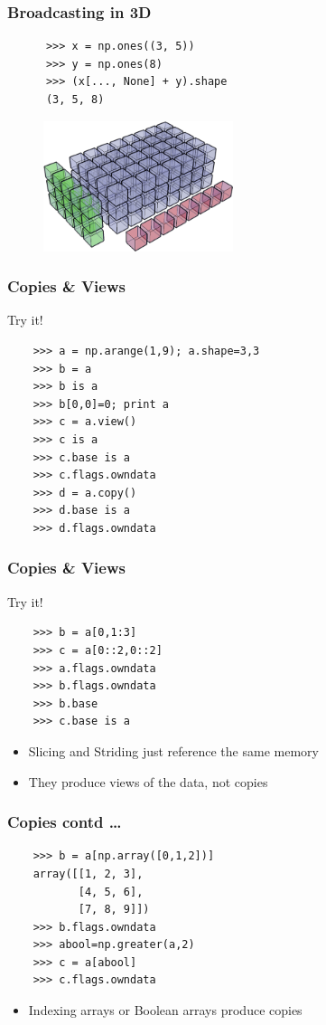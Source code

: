 \documentclass[14pt,compress]{beamer}
\newcounter{time}
\newcommand{\inctime}[1]{\addtocounter{time}{#1}{\tiny \thetime\ m}}
\begin{document}
\begin{frame}[fragile]
  \frametitle{Broadcasting in 3D}
    \begin{lstlisting}
      >>> x = np.ones((3, 5))
      >>> y = np.ones(8)
      >>> (x[..., None] + y).shape
      (3, 5, 8)
    \end{lstlisting}
    \begin{figure}
      \begin{center}
      \includegraphics[height=1.5in, interpolate=true]{data/array_3x5x8}        
      \end{center}
    \end{figure}
\end{frame}

\begin{frame}[fragile]
  \frametitle{Copies \& Views}
  Try it!
  \vspace{-0.1in}
  \begin{lstlisting}
    >>> a = np.arange(1,9); a.shape=3,3
    >>> b = a
    >>> b is a
    >>> b[0,0]=0; print a
    >>> c = a.view()
    >>> c is a
    >>> c.base is a
    >>> c.flags.owndata
    >>> d = a.copy()
    >>> d.base is a
    >>> d.flags.owndata
  \end{lstlisting}
\end{frame}

\begin{frame}[fragile]
  \frametitle{Copies \& Views}
  Try it!
  \vspace{-0.1in}
  \begin{lstlisting}
    >>> b = a[0,1:3]
    >>> c = a[0::2,0::2]
    >>> a.flags.owndata
    >>> b.flags.owndata
    >>> b.base
    >>> c.base is a
  \end{lstlisting}
  \begin{itemize}
  \item Slicing and Striding just reference the same memory
  \item They produce views of the data, not copies
  \end{itemize}
\end{frame}

\begin{frame}[fragile]
  \frametitle{Copies contd \ldots}
  \begin{lstlisting}
    >>> b = a[np.array([0,1,2])]
    array([[1, 2, 3],
           [4, 5, 6],
           [7, 8, 9]])
    >>> b.flags.owndata
    >>> abool=np.greater(a,2)
    >>> c = a[abool]
    >>> c.flags.owndata
  \end{lstlisting}
  \begin{itemize}
  \item Indexing arrays or Boolean arrays produce copies
  \end{itemize}
\inctime{15}
\end{frame}
\end{document}
